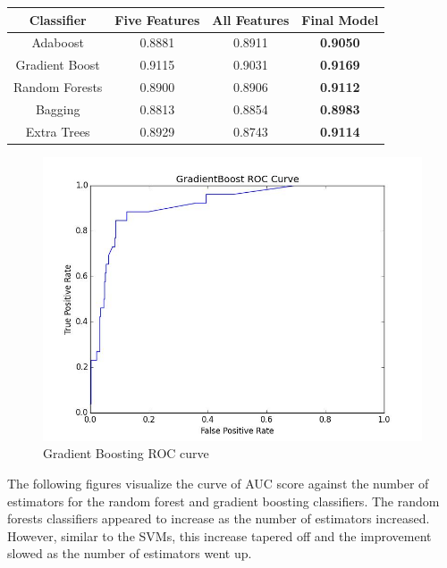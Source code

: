 \documentclass{article} %
\begin{document}
\begin{tabular}{c|ccc}
Classifier & Five Features & All Features & Final Model\\
\hline
Adaboost & 0.8881 & 0.8911 & \textbf{0.9050}\\
Gradient Boost & 0.9115 & 0.9031 & \textbf{0.9169}\\
Random Forests & 0.8900 & 0.8906 & \textbf{0.9112}\\
Bagging & 0.8813 & 0.8854 & \textbf{0.8983}\\
Extra Trees & 0.8929 & 0.8743 & \textbf{0.9114}
\end{tabular}

\clearpage

\begin{figure}[h]
\centering
{\caption{Gradient Boosting ROC curve} \includegraphics[scale=0.4]{img/grad_roc.jpg}}
\end{figure}

The following figures visualize the curve of AUC score against the number of
estimators for the random forest and gradient boosting classifiers. The random
forests classifiers appeared to increase as the number of estimators increased.
However, similar to the SVMs, this increase tapered off and the improvement
slowed as the number of estimators went up.
\end{document}
